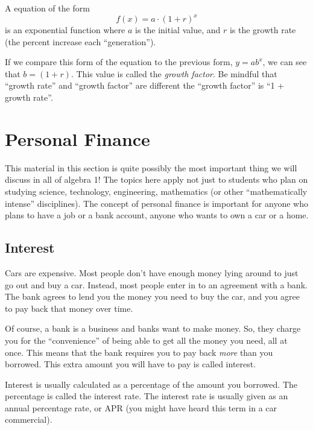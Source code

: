 \begin{boxeddef}
A equation of the form \[f(x) = a\cdot(1+r)^x\] is an exponential function where $a$ is the initial value, and $r$ is the growth rate (the percent increase each ``generation'').
\end{boxeddef}

If we compare this form of the equation to the previous form, $y=ab^x$, we can see that $b=(1+r)$. This value is called the \textit{growth factor}. Be mindful that ``growth rate'' and ``growth factor'' are different the ``growth factor'' is ``1 + growth rate''.


\section{Personal Finance}
\label{sec:expofinance}

This material in this section is quite possibly the most important thing we will discuss in all of algebra 1! The topics here apply not just to students who plan on studying science, technology, engineering, mathematics (or other ``mathematically intense'' disciplines). The concept of personal finance is important for anyone who plans to have a job or a bank account, anyone who wants to own a car or a home.

\subsection{Interest}

Cars are expensive. Most people don't have enough money lying around to just go out and buy a car. Instead, most people enter in to an agreement with a bank. The bank agrees to lend you the money you need to buy the car, and you agree to pay back that money over time.

Of course, a bank is a business and banks want to make money. So, they charge you for the ``convenience'' of being able to get all the money you need, all at once. This means that the bank requires you to pay back \textit{more} than you borrowed. This extra amount you will have to pay is called \gls{interest}.

Interest is usually calculated as a percentage of the amount you borrowed. The percentage is called the \gls{interest rate}. The interest rate is usually given as an annual percentage rate, or APR (you might have heard this term in a car commercial).

